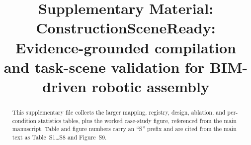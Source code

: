 \documentclass[final,12pt]{elsarticle}
\begin{document}
\begin{frontmatter}
\title{Supplementary Material:\\ConstructionSceneReady: Evidence-grounded
compilation and task-scene validation for BIM-driven robotic assembly}
\begin{abstract}
This supplementary file collects the larger mapping, registry, design,
ablation, and per-condition statistics tables, plus the worked case-study
figure, referenced from the main manuscript. Table and figure numbers carry
an ``S'' prefix and are cited from the main text as Table~S1\ldots S8 and
Figure~S9.
\end{abstract}
\end{frontmatter}


\end{document}
